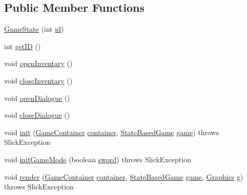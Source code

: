 \subsection*{Public Member Functions}
\begin{DoxyCompactItemize}
\item 
\mbox{\hyperlink{classstates_1_1_game_state_ad9c29c35e2006697858b75c75a6c9b8b}{Game\+State}} (int \mbox{\hyperlink{classstates_1_1_game_state_a6753ed5810e190d122a36ede7a52d4b3}{id}})
\item 
int \mbox{\hyperlink{classstates_1_1_game_state_a7d95efb1651c71933e6c3228829cfb33}{get\+ID}} ()
\item 
void \mbox{\hyperlink{classstates_1_1_game_state_a487c240070c56cae7ca69c4066ccefa8}{open\+Inventary}} ()
\item 
void \mbox{\hyperlink{classstates_1_1_game_state_a7b673342f6dc74ba4c452ff346782d04}{close\+Inventary}} ()
\item 
void \mbox{\hyperlink{classstates_1_1_game_state_a4d77661bfb3bf9d51cb10807fb300215}{open\+Dialogue}} ()
\item 
void \mbox{\hyperlink{classstates_1_1_game_state_a68370a33c4250e3a8fe588e1ace01d85}{close\+Dialogue}} ()
\item 
void \mbox{\hyperlink{classstates_1_1_game_state_a3fe60e1878feb13a073438a647273343}{init}} (\mbox{\hyperlink{classorg_1_1newdawn_1_1slick_1_1_game_container}{Game\+Container}} \mbox{\hyperlink{classstates_1_1_game_state_a88b0df4b57ada742c53e4e1ee3b25827}{container}}, \mbox{\hyperlink{classorg_1_1newdawn_1_1slick_1_1state_1_1_state_based_game}{State\+Based\+Game}} \mbox{\hyperlink{classstates_1_1_game_state_a5f563e34a3fc7d777396b68e00b321f5}{game}})  throws Slick\+Exception 
\item 
void \mbox{\hyperlink{classstates_1_1_game_state_a9ed552e4fa17b64ddca450de007ba411}{init\+Game\+Mode}} (boolean \mbox{\hyperlink{classstates_1_1_game_state_af984dc048942d10169fb7127bcc30273}{sword}})  throws Slick\+Exception 
\item 
void \mbox{\hyperlink{classstates_1_1_game_state_a9500cae36bcfef4c7002c7086ef9429d}{render}} (\mbox{\hyperlink{classorg_1_1newdawn_1_1slick_1_1_game_container}{Game\+Container}} \mbox{\hyperlink{classstates_1_1_game_state_a88b0df4b57ada742c53e4e1ee3b25827}{container}}, \mbox{\hyperlink{classorg_1_1newdawn_1_1slick_1_1state_1_1_state_based_game}{State\+Based\+Game}} \mbox{\hyperlink{classstates_1_1_game_state_a5f563e34a3fc7d777396b68e00b321f5}{game}}, \mbox{\hyperlink{classorg_1_1newdawn_1_1slick_1_1_graphics}{Graphics}} g)  throws Slick\+Exception 

\end{DoxyCompactItemize}

